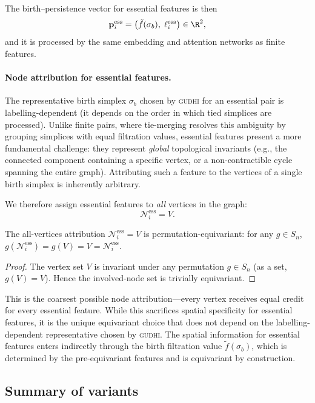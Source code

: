 The birth--persistence vector for essential features is then
\[
    \mathbf{p}_i^{\mathrm{ess}} = \big(\tilde{f}(\sigma_b),\; \ell_i^{\mathrm{ess}}\big) \in \R^2,
\]
and it is processed by the same embedding and attention networks as finite features.

\paragraph{Node attribution for essential features.}
The representative birth simplex $\sigma_b$ chosen by \textsc{gudhi} for an essential pair is labelling-dependent (it depends on the order in which tied simplices are processed). Unlike finite pairs, where tie-merging resolves this ambiguity by grouping simplices with equal filtration values, essential features present a more fundamental challenge: they represent \emph{global} topological invariants (e.g., the connected component containing a specific vertex, or a non-contractible cycle spanning the entire graph). Attributing such a feature to the vertices of a single birth simplex is inherently arbitrary.

We therefore assign essential features to \emph{all} vertices in the graph:
\[
    \mathcal{N}_i^{\mathrm{ess}} = V.
\]

\begin{proposition}
\label{prop:ess_equiv}
The all-vertices attribution $\mathcal{N}_i^{\mathrm{ess}} = V$ is permutation-equivariant: for any $g \in S_n$, $g(\mathcal{N}_i^{\mathrm{ess}}) = g(V) = V = \mathcal{N}_i^{\mathrm{ess}}$.
\end{proposition}

\begin{proof}
The vertex set $V$ is invariant under any permutation $g \in S_n$ (as a set, $g(V) = V$). Hence the involved-node set is trivially equivariant.
\end{proof}

This is the coarsest possible node attribution---every vertex receives equal credit for every essential feature. While this sacrifices spatial specificity for essential features, it is the unique equivariant choice that does not depend on the labelling-dependent representative chosen by \textsc{gudhi}. The spatial information for essential features enters indirectly through the birth filtration value $\tilde{f}(\sigma_b)$, which is determined by the pre-equivariant features and is equivariant by construction.


\subsection{Summary of variants}

